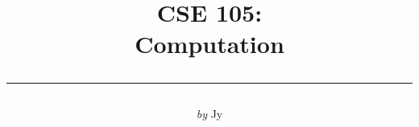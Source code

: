 \documentclass[12pt, letterpaper, titlepage]{article}
\title{\Huge CSE 105: \\ Computation
	   \\[-1em] \rule{.8\textwidth}{1pt}
}
\author{\LARGE{\it by} Jy}
\date{}
\theoremstyle{mystyle}
\renewcommand{\(}{ \left(  }
\renewcommand{\)}{ \right) }
\begin{document}
\maketitle
\renewcommand{\thepage}{\roman{page}}\setcounter{page}{1}
\tableofcontents\clearpage
\renewcommand{\thepage}{\arabic{page}}\setcounter{page}{1}





\end{document}
